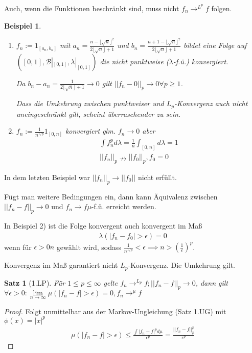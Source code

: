 \documentclass[]{article}
\newtheorem{theorem}{Satz}
\newtheorem*{example}{Beispiel}
\begin{document}
Auch, wenn die Funktionen beschränkt sind, muss nicht $f_n \rightarrow^{L^p} f$ folgen.
\begin{example}
	\begin{enumerate}
		\item $f_n := 1_[a_n,b_n]$ mit $a_n = \frac{n - \lfloor \sqrt{n} \rfloor^2}{2 \lfloor \sqrt{n} \rfloor + 1}$ und $b_n = \frac{n + 1 - \lfloor \sqrt{n} \rfloor^2}{2 \lfloor \sqrt{n} \rfloor + 1}$ bildet eine Folge auf $([0,1], \mathcal{B}|_{[0,1]}, \lambda|_{[0,1]})$ die nicht punktweise ($\lambda$-f.ü.) konvergiert.
		
		Da $b_n - a_n = \frac{1}{2\lfloor \sqrt{n} \rfloor + 1} \rightarrow 0$ gilt $||f_n - 0||_p \rightarrow 0 \forall p \geq 1$.
		
		Dass die Umkehrung zwischen punktweiser und $L_p$-Konvergenz auch nicht uneingeschränkt gilt, scheint überraschender zu sein.
		
		\item $f_n := \frac{1}{n^{1/p}}1_{[0,n]}$ konvergiert glm. $f_n \rightarrow 0$ aber
		\begin{align*}
			\int f_n^p d\lambda = \frac{1}{n} \int_{[0,n]} d\lambda = 1\\
			||f_n||_p \nrightarrow ||f_0||_p, f_0=0
		\end{align*}
	\end{enumerate}	
\end{example}

In dem letzten Beispiel war $||f_n||_p \rightarrow ||f_0||$ nicht erfüllt.

Fügt man weitere Bedingungen ein, dann kann Äquivalenz zwischen $||f_n-f||_p \rightarrow 0$ und $f_n \rightarrow f \mu$-f.ü. erreicht werden.

In Beispiel 2) ist die Folge konvergent auch konvergent im Maß
\begin{align*}
	\lambda(|f_n-f_0| > \epsilon) = 0
\end{align*}
wenn für $\epsilon > 0 n$ gewählt wird, sodass $\frac{1}{n^{1/p}} < \epsilon \implies n > (\frac{1}{\epsilon})^p$.

Konvergenz im Maß garantiert nicht $L_p$-Konvergenz. Die Umkehrung gilt.

\begin{theorem}[1.LP]
	Für $1\leq p \leq \infty$ gelte $f_n \rightarrow^{L_p} f; ||f_n-f||_p\rightarrow 0$, dann gilt $\forall \epsilon > 0: \lim\limits_{n\rightarrow\infty} \mu(|f_n-f| > \epsilon) = 0, f_n \rightarrow^\mu f$
\end{theorem}
\begin{proof}
	Folgt unmittelbar aus der Markov-Ungleichung (Satz 1.UG) mit $\phi(x)=|x|^p$
	\begin{align*}
		\mu(|f_n-f|>\epsilon) \leq \frac{\int |f_n - f|^p d\mu}{\epsilon^p} = \frac{||f_n - f||_p^p}{\epsilon^p}
	\end{align*}
\end{proof}
\end{document}
